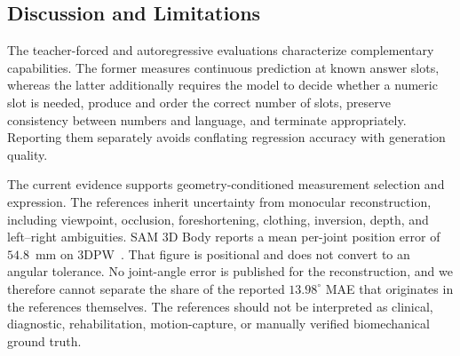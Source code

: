 \begin{table}[t]
    \centering
    \caption{Autoregressive generation on 310 test records. Slot accuracy is
    measured on the full test set and reported with Wilson 95\% confidence
    intervals. Numeric errors use the 160-record common-success subset.}
    \label{tab:generation_results}
\end{table}

\subsection{Discussion and Limitations}
\label{sec:result_interpretation}

The teacher-forced and autoregressive evaluations characterize complementary capabilities.
The former measures continuous prediction at known answer slots, whereas the latter additionally requires the model to decide whether a numeric slot is needed, produce and order the correct number of slots, preserve consistency between numbers and language, and terminate appropriately.
Reporting them separately avoids conflating regression accuracy with generation quality.

The current evidence supports geometry-conditioned measurement selection and expression.
The references inherit uncertainty from monocular reconstruction, including viewpoint, occlusion, foreshortening, clothing, inversion, depth, and left--right ambiguities.
SAM 3D Body reports a mean per-joint position error of $54.8$~mm on 3DPW~\cite{yang2026sam3dbody}.
That figure is positional and does not convert to an angular tolerance.
No joint-angle error is published for the reconstruction, and we therefore cannot separate the share of the reported $13.98^\circ$ MAE that originates in the references themselves.
The references should not be interpreted as clinical, diagnostic, rehabilitation, motion-capture, or manually verified biomechanical ground truth.

